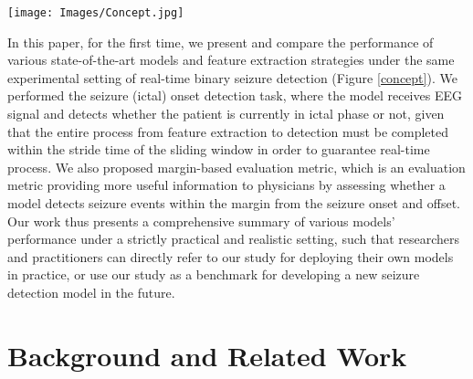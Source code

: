 \documentclass[pmlr,twocolumn,10pt]{jmlr}
\begin{document}
\begin{figure*}[ht!]
	\centering
	\texttt{[image: Images/Concept.jpg]}
    \caption{\small \textbf{Real-Time Seizure Detection with CNN (+LSTM) models.} We downsample the EEG signal and extract features (Figure \ref{preproc}). The models detect whether ictal/non-ictal signal appears within the 4-second sliding window input. We present an example case with a Raw EEG signal but other signal feature extractors can also be applied to the pipeline.}
	\label{concept}
\end{figure*} In this paper, for the first time, we present and compare the performance of various state-of-the-art models and feature extraction strategies under the same experimental setting of real-time binary seizure detection (Figure \ref{concept}).
We performed the seizure (ictal) onset detection task, where the model receives EEG signal and detects whether the patient is currently in ictal phase or not, given that the entire process from feature extraction to detection must be completed within the stride time of the sliding window in order to guarantee real-time process.
We also proposed margin-based evaluation metric, which is an evaluation metric providing more useful information to physicians by assessing whether a model detects seizure events within the margin from the seizure onset and offset. 
Our work thus presents a comprehensive summary of various models' performance under a strictly practical and realistic setting, such that researchers and practitioners can directly refer to our study for deploying their own models in practice, or use our study as a benchmark for developing a new seizure detection model in the future.






 \section{Background and Related Work}
\end{document}
